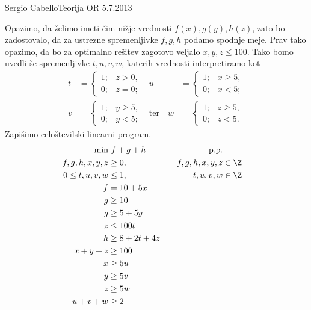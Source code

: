 \begin{naloga}{Sergio Cabello}{Teorija OR 5.7.2013}
\begin{odgovor}
Opazimo, da želimo imeti čim nižje vrednosti $f(x), g(y), h(z)$,
zato bo zadostovalo,
da za ustrezne spremenljivke $f, g, h$ podamo spodnje meje.
Prav tako opazimo,
da bo za optimalno rešitev zagotovo veljalo $x, y, z \le 100$.
Tako bomo uvedli še spremenljivke $t, u, v, w$,
katerih vrednosti interpretiramo kot
\begin{align*}
t &= \begin{cases}
1; & z > 0, \\
0; & z = 0;
\end{cases} &
u &= \begin{cases}
1; & x \ge 5, \\
0; & x < 5;
\end{cases} \\
v &= \begin{cases}
1; & y \ge 5, \\
0; & y < 5;
\end{cases} &
\text{ter} \quad
w &= \begin{cases}
1; & z \ge 5, \\
0; & z < 5.
\end{cases}
\end{align*}
Zapišimo celoštevilski linearni program.
\begin{alignat*}{2}
\min &\ f + g + h &\quad \text{p.p.} \\
f, g, h, x, y, z &\ge 0, &\quad f, g, h, x, y, z &\in \Z \\
0 \le t, u, v, w &\le 1, &\quad t, u, v, w &\in \Z \\
f &= 10 + 5x \\
g &\ge 10 \\
g &\ge 5 + 5y \\
z &\le 100t \\
h &\ge 8 + 2t + 4z \\
x + y + z &\ge 100 \\
x &\ge 5u \\
y &\ge 5v \\
z &\ge 5w \\
u + v + w &\ge 2
\end{alignat*}
\end{odgovor}
\end{naloga}
